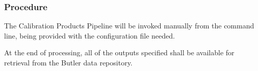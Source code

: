 \subsubsection{Procedure}

The Calibration Products Pipeline will be invoked manually from the command
line, being provided with the configuration file needed.

At the end of processing, all of the outputs specified shall be available for
retrieval from the Butler data repository.
